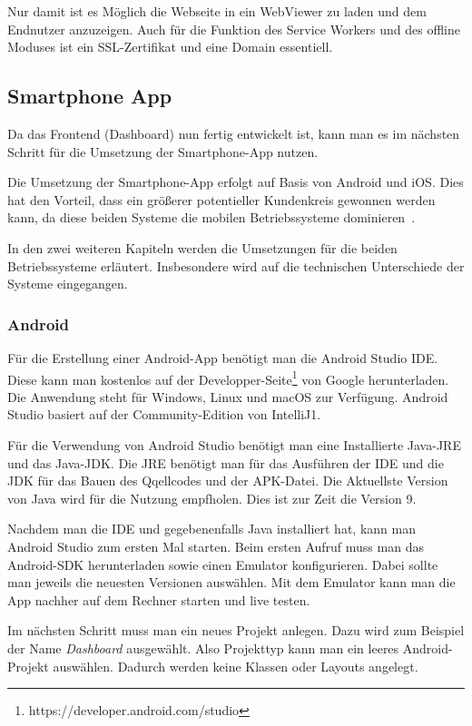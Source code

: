 Nur damit ist es Möglich die Webseite in ein WebViewer zu laden und dem Endnutzer anzuzeigen. Auch für die
Funktion des Service Workers und des offline Moduses ist ein SSL-Zertifikat und eine Domain essentiell.

\subsection{Smartphone App}
Da das Frontend (Dashboard) nun fertig entwickelt ist, kann man es im nächsten Schritt für die Umsetzung der
Smartphone-App nutzen.

Die Umsetzung der Smartphone-App erfolgt auf Basis von Android und iOS. Dies hat den Vorteil, dass ein größerer
potentieller Kundenkreis gewonnen werden kann, da diese beiden Systeme die mobilen Betriebssysteme
dominieren~\cite{online_umsetzung_mobileos}.

In den zwei weiteren Kapiteln werden die Umsetzungen für die beiden Betriebssysteme erläutert. Insbesondere wird auf die
technischen Unterschiede der Systeme eingegangen.

\subsubsection{Android}
Für die Erstellung einer Android-App benötigt man die Android Studio IDE. Diese kann man kostenlos auf der
Developper-Seite\footnote{https://developer.android.com/studio} von Google herunterladen. Die Anwendung steht für
Windows, Linux und macOS zur Verfügung. Android Studio basiert auf der Community-Edition von IntelliJ1.

Für die Verwendung von Android Studio benötigt man eine Installierte Java-JRE und das Java-JDK. Die JRE benötigt man für
das Ausführen der IDE und die JDK für das Bauen des Qqellcodes und der APK-Datei. Die Aktuellste Version von Java wird
für die Nutzung empfholen. Dies ist zur Zeit die Version 9.

Nachdem man die IDE und gegebenenfalls Java installiert hat, kann man Android Studio zum ersten Mal starten. Beim ersten
Aufruf muss man das Android-SDK herunterladen sowie einen Emulator konfigurieren. Dabei sollte man jeweils die neuesten
Versionen auswählen. Mit dem Emulator kann man die App nachher auf dem Rechner starten und live testen.

Im nächsten Schritt muss man ein neues Projekt anlegen. Dazu wird zum Beispiel der Name \textit{Dashboard} ausgewählt.
Also Projekttyp kann man ein leeres Android-Projekt auswählen. Dadurch werden keine Klassen oder Layouts angelegt.

